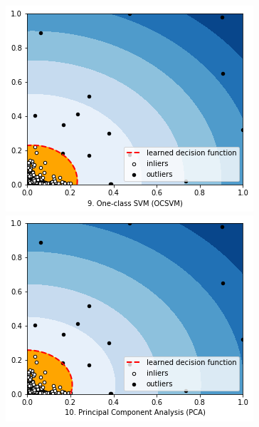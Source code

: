 \documentclass[12pt,twoside]{report}
\begin{document}
\begin{figure}[H]
\begin{multicols}{2}
    \includegraphics[width=\linewidth]{../code/figures/ocsvm.png}\par 
    \includegraphics[width=\linewidth]{../code/figures/pca.png}\par 
\end{multicols}
\label{fig:ocsvm-pca}
\end{figure}
\end{document}
